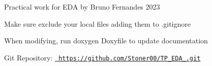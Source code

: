 Practical work for EDA by Bruno Fernandes 2023

Make sure exclude your local files adding them to .gitignore

When modifying, run doxygen Doxyfile to update documentation

Git Repository\+: \href{https://github.com/Stoner00/TP_EDA_18576.git}{\texttt{ https\+://github.\+com/\+Stoner00/\+TP\+\_\+\+EDA\+\_.\+git}} 